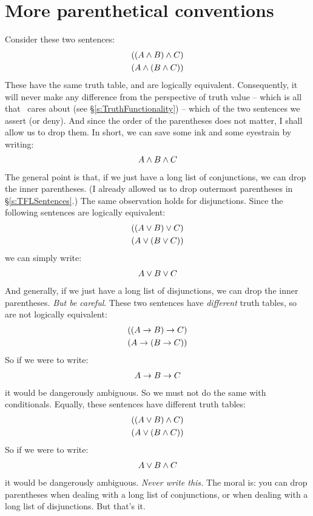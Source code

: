 \section{More parenthetical conventions}\label{s:MoreParentheticalConventions}
Consider these two sentences:
	\begin{align*}
		((A \wedge B) \wedge C)\\
		(A \wedge (B \wedge C))
	\end{align*}
These have the same truth table, and are logically equivalent.  Consequently, it will never make any difference from the perspective of truth value – which is all that \TFL\ cares about (see §\ref{s:TruthFunctionality}) – which of the two sentences we assert (or deny). And since the order of the parentheses does not matter, I shall allow us to drop them.  In short, we can save some ink and some eyestrain by writing:
	\begin{align*}
		A \wedge B \wedge C
	\end{align*}
The general point is that, if we just have a long list of conjunctions, we can drop the inner parentheses. (I already allowed us to drop outermost parentheses in §\ref{s:TFLSentences}.) The same observation holds for disjunctions. Since the following sentences are logically equivalent:
	\begin{align*}
		((A \vee B) \vee C)\\
		(A \vee (B \vee C))
	\end{align*}
we can simply write:
	\begin{align*}
		A \vee B \vee C
	\end{align*}
And generally, if we just have a long list of disjunctions, we can drop the inner parentheses. \emph{But be careful}. These two sentences have \emph{different} truth tables, so are not logically equivalent:
	\begin{align*}
		((A \rightarrow B) \rightarrow C)\\
		(A \rightarrow (B \rightarrow C))
	\end{align*}
So if we were to write:
	\begin{align*}
		A \rightarrow B \rightarrow C
	\end{align*}
it would be dangerously ambiguous. So we must not do the same with conditionals. Equally, these sentences have different truth tables:
	\begin{align*}
		((A \vee B) \wedge C)\\
		(A \vee (B \wedge C))
	\end{align*}
So if we were to write:
	\begin{align*}
		A \vee B \wedge C
	\end{align*}
it would be dangerously ambiguous. \emph{Never write this.} The moral is: you can drop parentheses when dealing with a long list of conjunctions, or when dealing with a long list of disjunctions. But that's it.


